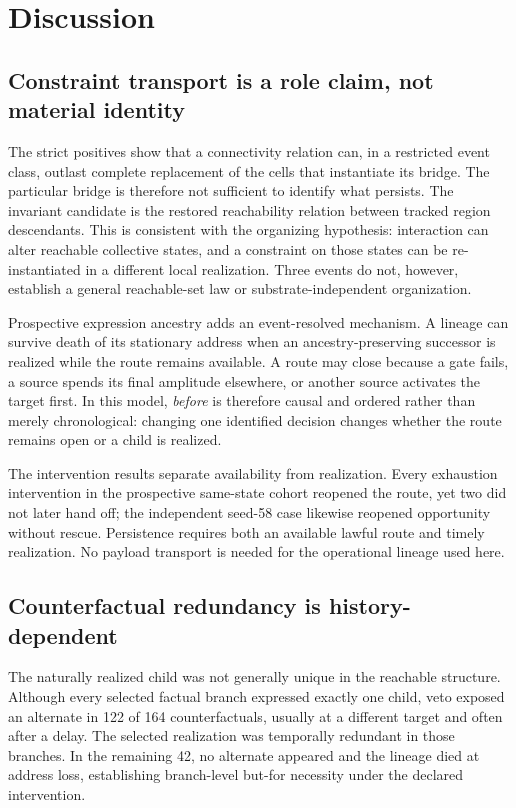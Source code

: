 \section{Discussion}
\label{sec:discussion}

\subsection{Constraint transport is a role claim, not material identity}

The strict positives show that a connectivity relation can, in a restricted
event class, outlast complete replacement of the cells that instantiate its
bridge. The particular bridge is therefore not sufficient to identify what
persists. The invariant candidate is the restored reachability relation between
tracked region descendants. This is consistent with the organizing hypothesis:
interaction can alter reachable collective states, and a constraint on those
states can be re-instantiated in a different local realization. Three events do
not, however, establish a general reachable-set law or substrate-independent
organization.

Prospective expression ancestry adds an event-resolved mechanism. A lineage can
survive death of its stationary address when an ancestry-preserving successor
is realized while the route remains available. A route may close because a gate
fails, a source spends its final amplitude elsewhere, or another source
activates the target first. In this model, \emph{before} is therefore causal and
ordered rather than merely chronological: changing one identified decision
changes whether the route remains open or a child is realized.

The intervention results separate availability from realization. Every
exhaustion intervention in the prospective same-state cohort reopened the route,
yet two did not later hand off; the independent seed-58 case likewise reopened
opportunity without rescue. Persistence requires both an available lawful route
and timely realization. No payload transport is needed for the operational
lineage used here.

\subsection{Counterfactual redundancy is history-dependent}

The naturally realized child was not generally unique in the reachable
structure. Although every selected factual branch expressed exactly one child,
veto exposed an alternate in 122 of 164 counterfactuals, usually at a different
target and often after a delay. The selected realization was temporally
redundant in those branches. In the remaining 42, no alternate appeared and the
lineage died at address loss, establishing branch-level but-for necessity under
the declared intervention.

